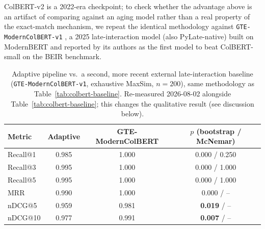 \documentclass[a4paper,twoside]{article}
\begin{document}
ColBERT-v2 is a 2022-era checkpoint; to check whether the advantage above is an artifact of comparing against an aging model rather than a real property of the exact-match mechanism, we repeat the identical methodology against \texttt{GTE-ModernColBERT-v1} \citep{chaffin2025gtemoderncolbert}, a 2025 late-interaction model (also PyLate-native) built on ModernBERT and reported by its authors as the first model to beat ColBERT-small on the BEIR benchmark.

\begin{table}[t]
\caption{Adaptive pipeline vs.\ a second, more recent external late-interaction baseline (\texttt{GTE-ModernColBERT-v1}, exhaustive MaxSim, $n=200$), same methodology as Table~\ref{tab:colbert-baseline}. Re-measured 2026-08-02 alongside Table~\ref{tab:colbert-baseline}; this changes the qualitative result (see discussion below).}\label{tab:gte-colbert-baseline} \centering
\begin{tabular}{|l|c|c|c|}
\hline
Metric & Adaptive & GTE-ModernColBERT & $p$ (bootstrap / McNemar) \\
\hline
Recall@1 & 0.985 & 1.000 & 0.000 / 0.250 \\
Recall@3 & 0.995 & 1.000 & 0.000 / 1.000 \\
Recall@5 & 0.995 & 1.000 & 0.000 / 1.000 \\
MRR & 0.990 & 1.000 & 0.000 / -- \\
nDCG@5 & 0.959 & 0.981 & \textbf{0.019} / -- \\
nDCG@10 & 0.977 & 0.991 & \textbf{0.007} / -- \\
\hline
\end{tabular}
\end{table}
\end{document}
